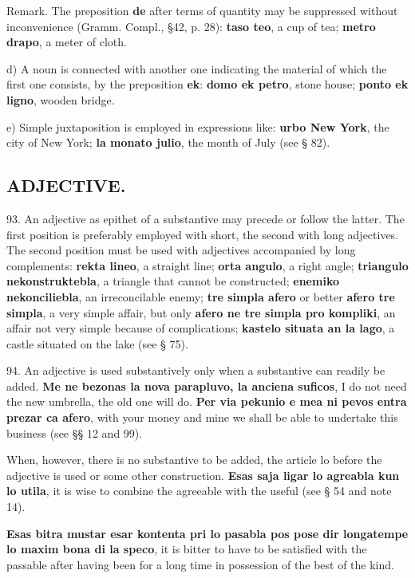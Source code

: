 \small Remark. The preposition \textbf{de} after terms of quantity may be suppressed without inconvenience (Gramm. Compl., §42, p. 28): \textbf{taso teo}, a cup of tea; \textbf{metro drapo}, a meter of cloth. \normalsize

d) A noun is connected with another one indicating the material of which the first one consists, by the preposition \textbf{ek}: \textbf{domo ek petro}, stone house; \textbf{ponto ek ligno}, wooden bridge. 

e) Simple juxtaposition is employed in expressions like: \textbf{urbo New York}, the city of New York; \textbf{la monato julio}, the month of July (see § 82).

\subsection*{ADJECTIVE.}
93. An adjective as epithet of a substantive may precede or follow the latter. The first position is preferably employed with short, the second with long adjectives. The second position must be used with adjectives accompanied by long complements: \textbf{rekta lineo}, a straight line; \textbf{orta angulo}, a right angle; \textbf{triangulo nekonstruktebla}, a triangle that cannot be constructed; \textbf{enemiko nekonciliebla}, an irreconcilable enemy; \textbf{tre simpla afero} or better \textbf{afero tre simpla}, a very simple affair, but only \textbf{afero ne tre simpla pro kompliki}, an affair not very simple because of complications; \textbf{kastelo situata an la lago}, a castle situated on the lake (see § 75).

94. An adjective is used substantively only when a substantive can readily be added. \textbf{Me ne bezonas la nova parapluvo, la anciena suficos}, I do not need the new umbrella, the old one will do. \textbf{Per via pekunio e mea ni pevos entra prezar ca afero}, with your money and mine we shall be able to undertake this business (see §§ 12 and 99). 

When, however, there is no substantive to be added, the article lo before the adjective is used or some other construction. \textbf{Esas saja ligar lo agreabla kun lo utila}, it is wise to combine the agreeable with the useful (see § 54 and note 14). 

\textbf{Esas bitra mustar esar kontenta pri lo pasabla pos pose dir longatempe lo maxim bona di la speco}, it is bitter to have to be satisfied with the passable after having been for a long time in possession of the best of the kind. 

